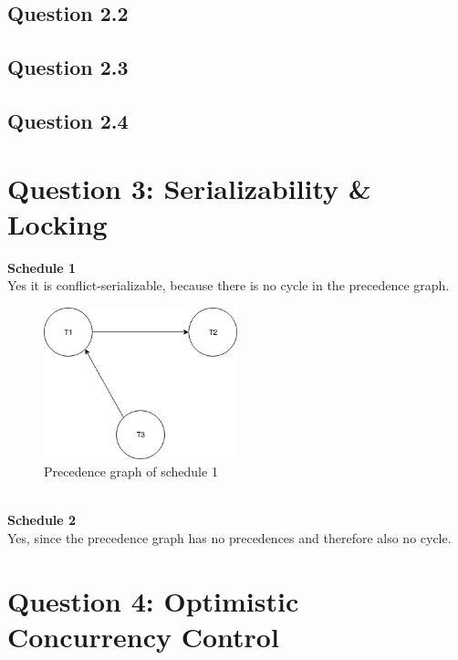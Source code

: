 \documentclass[12pt,a4paper]{article}
\begin{document}
\subsection{Question 2.2}

\subsection{Question 2.3}

\subsection{Question 2.4}

\section{Question 3: Serializability \& Locking}

\textbf{Schedule 1}\\
Yes it is conflict-serializable, because there is no cycle in the precedence graph.
\begin{figure}[!htb]
	\center
	\includegraphics[width=0.5\textwidth]{img/schedule1}
	\caption{Precedence graph of schedule 1}
\end{figure}\\
\textbf{Schedule 2}\\
Yes, since the precedence graph has no precedences and therefore also no cycle.

\section{Question 4: Optimistic Concurrency Control}
\end{document}
